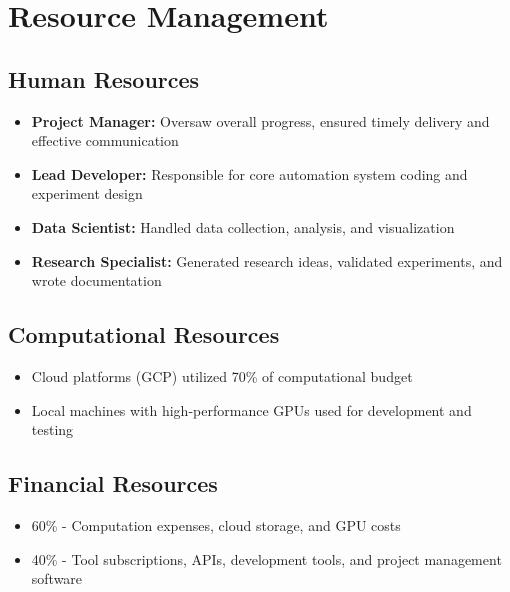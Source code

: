 \section{Resource Management}
\subsection{Human Resources}
\begin{itemize}
    \item \textbf{Project Manager:} Oversaw overall progress, ensured timely delivery and effective communication
    \item \textbf{Lead Developer:} Responsible for core automation system coding and experiment design
    \item \textbf{Data Scientist:} Handled data collection, analysis, and visualization
    \item \textbf{Research Specialist:} Generated research ideas, validated experiments, and wrote documentation
\end{itemize}

\subsection{Computational Resources}
\begin{itemize}
    \item Cloud platforms (GCP) utilized 70\% of computational budget
    \item Local machines with high-performance GPUs used for development and testing
\end{itemize}

\subsection{Financial Resources}
\begin{itemize}
    \item 60\% - Computation expenses, cloud storage, and GPU costs %
    \item 40\% - Tool subscriptions, APIs, development tools, and project management software %
\end{itemize}


